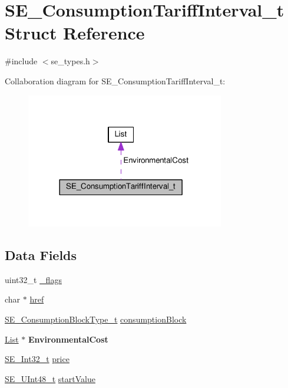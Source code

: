\hypertarget{structSE__ConsumptionTariffInterval__t}{}\section{S\+E\+\_\+\+Consumption\+Tariff\+Interval\+\_\+t Struct Reference}
\label{structSE__ConsumptionTariffInterval__t}


{\ttfamily \#include $<$se\+\_\+types.\+h$>$}



Collaboration diagram for S\+E\+\_\+\+Consumption\+Tariff\+Interval\+\_\+t\+:\nopagebreak
\begin{figure}[H]
\begin{center}
\leavevmode
\includegraphics[width=245pt]{structSE__ConsumptionTariffInterval__t__coll__graph}
\end{center}
\end{figure}
\subsection*{Data Fields}
\begin{DoxyCompactItemize}
\item 
uint32\+\_\+t \hyperlink{group__ConsumptionTariffInterval_gacbc5360ac90b58365b561193009cf141}{\+\_\+flags}
\item 
char $\ast$ \hyperlink{group__ConsumptionTariffInterval_ga443637f1365ce8d25ceb058b8dd9d93d}{href}
\item 
\hyperlink{group__ConsumptionBlockType_ga526f797922e4c3009d50c28f457c462e}{S\+E\+\_\+\+Consumption\+Block\+Type\+\_\+t} \hyperlink{group__ConsumptionTariffInterval_gab62382c449daf3ca552062780486fc3e}{consumption\+Block}
\item 
\hyperlink{structList}{List} $\ast$ {\bfseries Environmental\+Cost}
\item 
\hyperlink{group__Int32_gaa7afc819cfc8033c5fa408e34da8b71a}{S\+E\+\_\+\+Int32\+\_\+t} \hyperlink{group__ConsumptionTariffInterval_ga92c4173ce74527498b5aa9fa2782ee5f}{price}
\item 
\hyperlink{group__UInt48_gaa15d726fc29126d24b991437334d77a0}{S\+E\+\_\+\+U\+Int48\+\_\+t} \hyperlink{group__ConsumptionTariffInterval_ga6bdef05db8c5f945867838c51904afc1}{start\+Value}
\end{DoxyCompactItemize}


